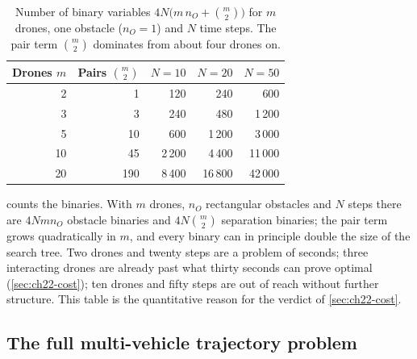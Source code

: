 \begin{table}[tb]
  \centering\small
  \caption{Number of binary variables $4N\bigl(m\,n_O + \binom{m}{2}\bigr)$
  for $m$ drones, one obstacle ($n_O = 1$) and $N$ time steps. The pair
  term $\binom{m}{2}$ dominates from about four drones on.}
  \label{tab:ch22-binaries}
  \begin{tabular}{@{}rrrrr@{}}
  \toprule
  Drones $m$ & Pairs $\binom{m}{2}$ & $N = 10$ & $N = 20$ & $N = 50$\\
  \midrule
  2 & 1 & 120 & 240 & 600\\
  3 & 3 & 240 & 480 & 1\,200\\
  5 & 10 & 600 & 1\,200 & 3\,000\\
  10 & 45 & 2\,200 & 4\,400 & 11\,000\\
  20 & 190 & 8\,400 & 16\,800 & 42\,000\\
  \bottomrule
  \end{tabular}
\end{table}

 counts the binaries. With $m$ drones, $n_O$
rectangular obstacles and $N$ steps there are $4 N m n_O$ obstacle binaries
and $4 N \binom{m}{2}$ separation binaries; the pair term grows
quadratically in $m$, and every binary can in principle double the size of
the search tree. Two drones and twenty steps are a problem of seconds; three interacting
drones are already past what thirty seconds can prove optimal
(\cref{sec:ch22-cost}); ten drones and fifty steps are out of reach without
further structure. This table is the quantitative reason for the
verdict of \cref{sec:ch22-cost}.

\subsection{The full multi-vehicle trajectory problem}
\label{sec:ch22-formulation}

